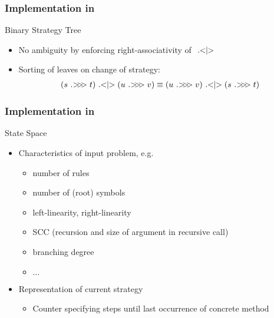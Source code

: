 \documentclass[xcolor=table%
,t]{beamer}
\begin{document}
\begin{frame}
  \frametitle{Implementation in \tct{}}

  \begin{block}{Binary Strategy Tree%
    }
    \centering
    \resizebox{0.8\linewidth}{!}{}
    \begin{itemize}
    \item No ambiguity by enforcing right-associativity of \(\ .\hspace{-3.0pt}<\hspace{-3.0pt}|\hspace{-3.0pt}>\)
    \item Sorting of leaves on change of strategy:
              \vspace{-1ex}
      \begin{align*}
      (s \seq t) \alter (u \seq v) \equiv  (u \seq v) \alter (s \seq t)
      \end{align*}
    \end{itemize}
  \end{block}
\end{frame}


\begin{frame}
  \frametitle{Implementation in \tct{}}

  \begin{block}{State Space}
    \begin{itemize}
    \item Characteristics of input problem, e.g.
      \begin{itemize}
      \item number of rules
      \item number of (root) symbols
      \item left-linearity, right-linearity
      \item SCC (recursion and size of argument in recursive call)
      \item branching degree
      \item \(\ldots\)
      \end{itemize}
    \item Representation of current strategy
      \begin{itemize}
      \item Counter specifying steps until last occurrence of concrete method
      \end{itemize}
    \end{itemize}
  \end{block}
\end{frame}
\end{document}

